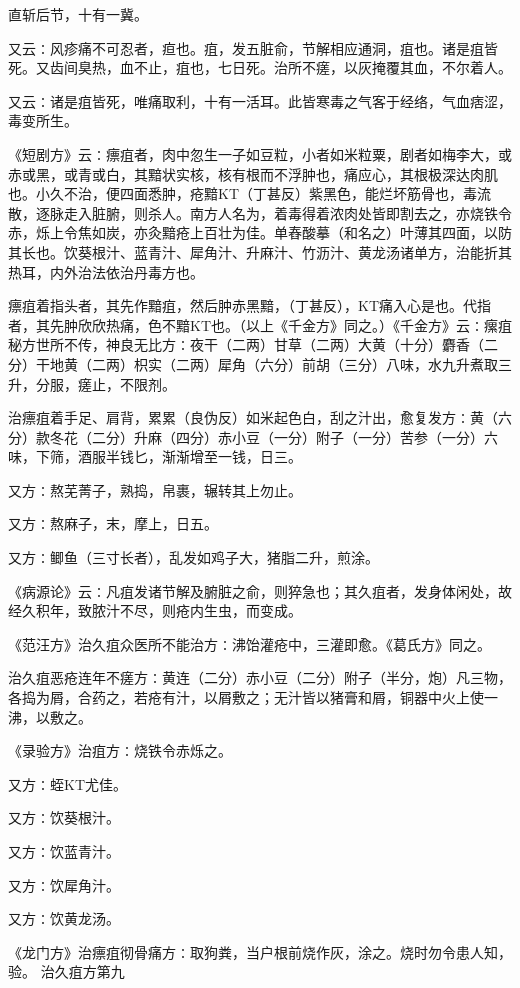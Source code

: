 \documentclass[a4paper,12pt,UTF8,twoside]{ctexbook}
\begin{document}
直斩后节，十有一冀。

又云∶风疹痛不可忍者，疸也。疽，发五脏俞，节解相应通洞，疽也。诸是疽皆死。又齿间臭热，血不止，疽也，七日死。治所不瘥，以灰掩覆其血，不尔着人。

又云∶诸是疽皆死，唯痛取利，十有一活耳。此皆寒毒之气客于经络，气血痞涩，毒变所生。

《短剧方》云∶瘭疽者，肉中忽生一子如豆粒，小者如米粒粟，剧者如梅李大，或赤或黑，或青或白，其黯状实核，核有根而不浮肿也，痛应心，其根极深达肉肌也。小久不治，便四面悉肿，疮黯KT（丁甚反）紫黑色，能烂坏筋骨也，毒流散，逐脉走入脏腑，则杀人。南方人名为，着毒得着浓肉处皆即割去之，亦烧铁令赤，烁上令焦如炭，亦灸黯疮上百壮为佳。单舂酸摹（和名之）叶薄其四面，以防其长也。饮葵根汁、蓝青汁、犀角汁、升麻汁、竹沥汁、黄龙汤诸单方，治能折其热耳，内外治法依治丹毒方也。

瘭疽着指头者，其先作黯疽，然后肿赤黑黯，（丁甚反），KT痛入心是也。代指者，其先肿欣欣热痛，色不黯KT也。（以上《千金方》同之。）《千金方》云∶瘰疽秘方世所不传，神良无比方∶夜干（二两）甘草（二两）大黄（十分）麝香（二分）干地黄（二两）枳实（二两）犀角（六分）前胡（三分）八味，水九升煮取三升，分服，瘥止，不限剂。

治瘭疽着手足、肩背，累累（良伪反）如米起色白，刮之汁出，愈复发方∶黄（六分）款冬花（二分）升麻（四分）赤小豆（一分）附子（一分）苦参（一分）六味，下筛，酒服半钱匕，渐渐增至一钱，日三。

又方∶熬芜菁子，熟捣，帛裹，辗转其上勿止。

又方∶熬麻子，末，摩上，日五。

又方∶鲫鱼（三寸长者），乱发如鸡子大，猪脂二升，煎涂。

《病源论》云∶凡疽发诸节解及腑脏之俞，则猝急也；其久疽者，发身体闲处，故经久积年，致脓汁不尽，则疮内生虫，而变成。

《范汪方》治久疽众医所不能治方∶沸饴灌疮中，三灌即愈。《葛氏方》同之。

治久疽恶疮连年不瘥方∶黄连（二分）赤小豆（二分）附子（半分，炮）凡三物，各捣为屑，合药之，若疮有汁，以屑敷之；无汁皆以猪膏和屑，铜器中火上使一沸，以敷之。

《录验方》治疽方∶烧铁令赤烁之。

又方∶蛭KT尤佳。

又方∶饮葵根汁。

又方∶饮蓝青汁。

又方∶饮犀角汁。

又方∶饮黄龙汤。

《龙门方》治瘭疽彻骨痛方∶取狗粪，当户根前烧作灰，涂之。烧时勿令患人知，验。
治久疽方第九
\end{document}
